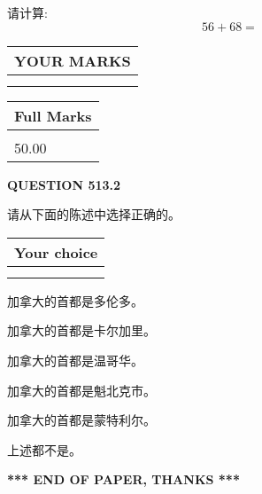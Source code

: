 \documentclass{ctexart}
\begin{document}
  
 
请计算:
\begin{equation}
56 +  %
68 = \nonumber
\end{equation}
 

 

 
  
\vspace{0.2in}
  
\noindent\begin{tabular}{|l|}
\hline
 YOUR MARKS  \\
\hline
 \\ 
 \\ 
\hline
\end{tabular}
\hspace{0.05in} \begin{tabular}{|l|}
\hline
 Full Marks  \\
\hline
 \\ 
50.00 \\
\hline
\end{tabular}
{\textbf{\Large{QUESTION
513.2 
}}}
  
  
请从下面的陈述中选择正确的。
  
  
\noindent\hspace{3.0in} \begin{tabular}{|l|}
\hline
Your choice \\
\hline
 \\ 
 \\ 
\hline
\end{tabular}
  
  
 
 
加拿大的首都是多伦多。
 
 
加拿大的首都是卡尔加里。
 
 
加拿大的首都是温哥华。
 
 
加拿大的首都是魁北克市。
 
 
加拿大的首都是蒙特利尔。
 
 
 上述都不是。
 
 
   
   
 \vspace{0.2in}
 
   
   
   
   
\vspace{1.0in} 
{\textbf{\large{ *** END OF PAPER, THANKS *** }}} 
   
\end{document}
